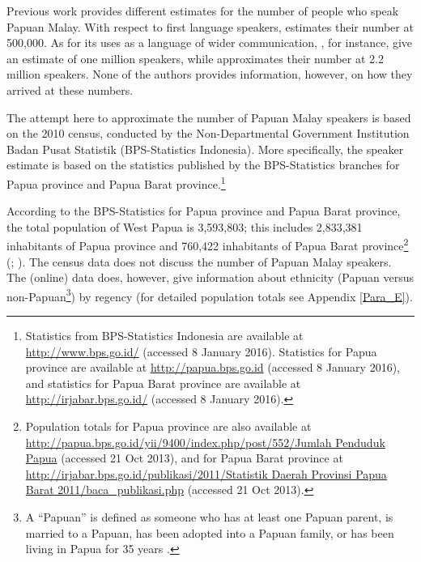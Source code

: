 {Previous work provides different estimates for the number of people who speak Papuan Malay. With respect to first language speakers, {\citet[1]{Clouse.2000}} estimates their number at 500,000. As for its uses as a language of wider communication, \citet{Burung.2007}, for instance, give an estimate of one million speakers, while {\citet[71]{Paauw.2009}} approximates their number at 2.2 million speakers. None of the authors provides information, however, on how they arrived at these numbers.



The attempt here to approximate the number of Papuan Malay speakers is based on the 2010 census, conducted by the Non-Departmental Government Institution Badan Pusat Statistik (BPS-Statistics Indonesia). More specifically, the speaker estimate is based on the statistics published by the BPS-Statistics branches for Papua province and Papua Barat province.\footnote{Statistics from BPS-Statistics Indonesia are available at \url{http://www.bps.go.id/} (accessed 8 January 2016). Statistics for Papua province are available at \url{http://papua.bps.go.id} (accessed 8 January 2016), and statistics for Papua Barat province are available at \url{http://irjabar.bps.go.id/} (accessed 8 January 2016).}



According to the BPS-Statistics for Papua province and Papua Barat province, the total population of West Papua is 3,593,803; this includes 2,833,381 inhabitants of Papua province and 760,422 inhabitants of Papua Barat province\footnote{\label{Footnote_1.38}Population totals for Papua province are also available at \url{http://papua.bps.go.id/yii/9400/index.php/post/552/Jumlah Penduduk Papua} (accessed 21 Oct 2013), and for Papua Barat province at \url{http://irjabar.bps.go.id/publikasi/2011/Statistik Daerah Provinsi Papua Barat 2011/baca_publikasi.php} (accessed 21 Oct 2013).} (\citealt[11--14]{BidangNeracaWilayahdanAnalisisStatistik.2011}; \citealt[92]{BidangNeracaWilayahdanAnalisisStatistik.2012}). The census data does not discuss the number of Papuan Malay speakers. The (online) data does, however, give information about ethnicity (Papuan versus non-Papuan\footnote{A  ``Papuan'' is defined as someone who has at least one Papuan parent, is married to a Papuan, has been adopted into a Papuan family, or has been living in Papua for 35 years \citep[11]{BidangNeracaWilayahdanAnalisisStatistik.2011b}.}) by regency (for detailed population totals see Appendix \ref{Para_E}).



}
